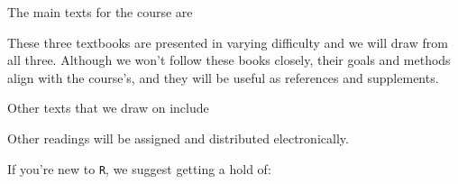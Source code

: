 \documentclass[12pt]{article}
\begin{document}
The main texts for the course are



\begin{verse}  \end{verse}

\begin{verse}  \end{verse}

\begin{verse}  \end{verse}

These three textbooks are presented in varying difficulty and we will draw from all three. Although we won't follow these books closely, their goals and methods align with the course's, and they will be useful as references and supplements.

Other texts that we draw on include

\begin{verse}   \end{verse}

\begin{verse}  \end{verse}












Other readings will be assigned and distributed electronically.

If you're new to \texttt{R}, we suggest getting a hold of:
\end{document}
